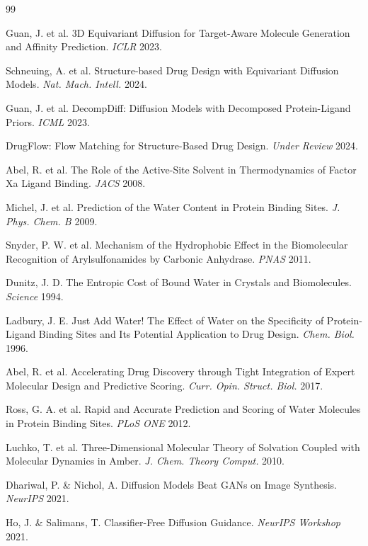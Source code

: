 \documentclass[journal=jcisd,manuscript=article]{achemso}
\begin{document}
\begin{thebibliography}{99}

 Guan, J. et al. 3D Equivariant Diffusion for Target-Aware
Molecule Generation and Affinity Prediction. \emph{ICLR} 2023.

 Schneuing, A. et al. Structure-based Drug Design with
Equivariant Diffusion Models. \emph{Nat. Mach. Intell.} 2024.

 Guan, J. et al. DecompDiff: Diffusion Models with Decomposed
Protein-Ligand Priors. \emph{ICML} 2023.

 DrugFlow: Flow Matching for Structure-Based Drug Design.
\emph{Under Review} 2024.

 Abel, R. et al. The Role of the Active-Site Solvent in
Thermodynamics of Factor Xa Ligand Binding. \emph{JACS} 2008.

 Michel, J. et al. Prediction of the Water Content in Protein
Binding Sites. \emph{J. Phys. Chem. B} 2009.

 Snyder, P. W. et al. Mechanism of the Hydrophobic Effect in
the Biomolecular Recognition of Arylsulfonamides by Carbonic Anhydrase.
\emph{PNAS} 2011.

 Dunitz, J. D. The Entropic Cost of Bound Water in Crystals
and Biomolecules. \emph{Science} 1994.

 Ladbury, J. E. Just Add Water! The Effect of Water on the
Specificity of Protein-Ligand Binding Sites and Its Potential Application
to Drug Design. \emph{Chem. Biol.} 1996.

 Abel, R. et al. Accelerating Drug Discovery through Tight
Integration of Expert Molecular Design and Predictive Scoring.
\emph{Curr. Opin. Struct. Biol.} 2017.

 Ross, G. A. et al. Rapid and Accurate Prediction and Scoring
of Water Molecules in Protein Binding Sites. \emph{PLoS ONE} 2012.

 Luchko, T. et al. Three-Dimensional Molecular Theory of
Solvation Coupled with Molecular Dynamics in Amber.
\emph{J. Chem. Theory Comput.} 2010.

 Dhariwal, P. \& Nichol, A. Diffusion Models Beat GANs on
Image Synthesis. \emph{NeurIPS} 2021.

 Ho, J. \& Salimans, T. Classifier-Free Diffusion Guidance.
\emph{NeurIPS Workshop} 2021.


\end{thebibliography}
\end{document}
